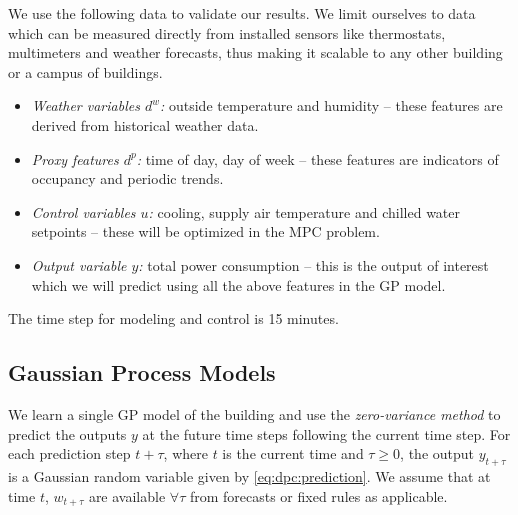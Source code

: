 We use the following data to validate our results. We limit ourselves to data which can be measured directly from installed sensors like thermostats, multimeters and weather forecasts, thus making it scalable to any other building or a campus of buildings.

\begin{itemize}
\item \textit{Weather variables \(d^w\):} outside temperature and humidity -- these features are derived from historical weather data.
\item \textit{Proxy features \(d^p\):} time of day, day of week -- these features are indicators of occupancy and periodic trends.
\item \textit{Control variables \(u\):} cooling, supply air temperature and chilled water setpoints -- these will be optimized in the MPC problem. %
\item \textit{Output variable \(y\):} total power consumption -- this is the output of interest which we will predict using all the above features in the GP model.
\end{itemize}

The time step for modeling and control is 15 minutes.

\subsection{Gaussian Process Models}
\label{SS:casestudy:gp}

We learn a single GP model of the building and use the \emph{zero-variance method} to predict the outputs \(y\) at the future time steps following the current time step.
For each prediction step $t+\tau$, where $t$ is the current time and \( \tau \ge 0\), %
the output \(y_{t+\tau}\) is a Gaussian random variable given by \eqref{eq:dpc:prediction}.
We assume that at time \(t\), \(w_{t+\tau}\) are available \(\forall \tau \) from forecasts or fixed rules as applicable.

